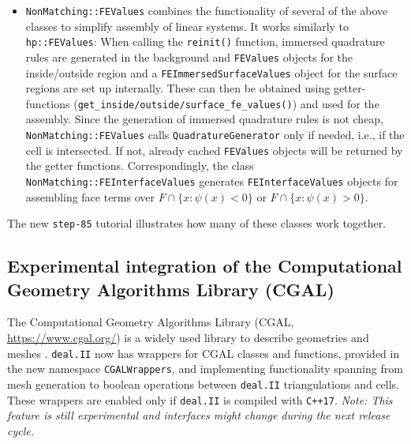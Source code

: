 \documentclass{ansarticle-preprint}
\newcommand{\specialword}[1]{\texttt{#1}}
\newcommand{\dealii}{{\specialword{deal.II}}\xspace}
\begin{document}
\begin{itemize}
  \item \texttt{NonMatching::FEValues} combines the functionality of
    several of the above classes to simplify assembly of linear systems. It works similarly to \texttt{hp::FEValues}:
  When calling the \texttt{reinit()} function, immersed quadrature rules are generated in the background and
  \texttt{FEValues} objects for the inside/outside region and a \texttt{FEImmersedSurfaceValues} object for the surface regions are set up internally. These can then be obtained using getter-functions (\texttt{get\_inside/outside/surface\_fe\_values()}) and used for the assembly.
  Since the generation of immersed quadrature rules is not cheap,
  \texttt{NonMatching::FEValues} calls  \texttt{QuadratureGenerator} only if needed, i.e., if the cell is intersected. If not, already cached \texttt{FEValues} objects will be returned by the getter functions.
  Correspondingly, the class \texttt{NonMatching::FEInterfaceValues} generates
  \texttt{FEInterfaceValues} objects for assembling face terms over $F \cap \{x : \psi(x) < 0 \}$ or $F \cap \{x : \psi(x) > 0 \}$.
\end{itemize}
The new \texttt{step-85} tutorial illustrates how many of these classes work together.




\subsection{Experimental integration of the Computational Geometry Algorithms
  Library (CGAL)}\label{sec:cgalwrappers}

The Computational Geometry Algorithms Library (CGAL, \url{https://www.cgal.org/}) is a widely used
library to describe geometries and meshes \cite{cgal}. \dealii{} now
has wrappers for CGAL classes and functions, provided in the new
namespace \texttt{CGALWrappers}, and implementing functionality
spanning from mesh generation to boolean operations between \dealii{}
triangulations and cells. These wrappers are enabled only if \dealii{}
is compiled with \texttt{C++17}. \textit{Note: This feature is still experimental and
interfaces might change during the next release cycle.}
\end{document}
